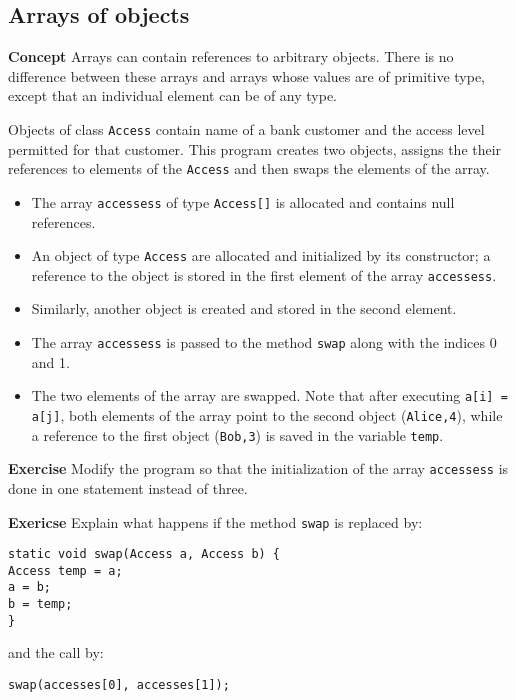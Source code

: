 \subsection{Arrays of objects}\label{array.09}

\textbf{Concept} Arrays can contain references to arbitrary objects. There is no difference between these arrays and arrays whose values are of primitive type, except that an individual element can be of any type.


Objects of class \texttt{Access} contain name of a bank customer and the access level permitted for that customer. This program creates two objects, assigns the their references to elements of the \texttt{Access} and then swaps the elements of the array.
\begin{itemize}
  \item The array \texttt{accessess} of type \texttt{Access[]} 
  is allocated and contains null references.
  \item An object of type \texttt{Access} are allocated and initialized by its constructor; a reference to the object is stored in the first element of the array \texttt{accessess}.
  \item Similarly, another object is created and stored in the second element.
  \item The array \texttt{accessess} is passed to the method \texttt{swap} along with the 
  indices 0 and 1.
  \item The two elements of the array are swapped. 
  Note that after executing \texttt{a[i] = a[j]}, 
  both elements of the array point to the second object (\texttt{Alice,4}), 
  while a reference to the first object (\texttt{Bob,3}) is saved in the variable \texttt{temp}.
\end{itemize}

\textbf{Exercise} Modify the program so that the initialization of the array
\texttt{accessess} is done in one statement instead of three.

\textbf{Exericse} Explain what happens if the method \texttt{swap} is replaced by: 

\hspace*{3em}\texttt{static void swap(Access a, Access b) \{}\\
\hspace*{6em}\texttt{Access temp = a;}\\
\hspace*{6em}\texttt{a = b;}\\
\hspace*{6em}\texttt{b = temp;}\\
\hspace*{3em}\texttt{\}}

and the call by:

\hspace*{3em}\texttt{swap(accesses[0], accesses[1]);}
